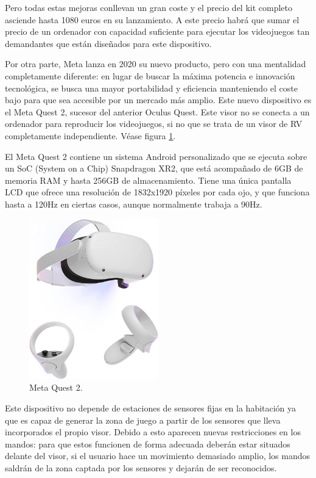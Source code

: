 Pero todas estas mejoras conllevan un gran coste y el precio del kit completo asciende hasta 1080 euros en su lanzamiento. A este precio habrá que sumar el precio de un ordenador con capacidad suficiente para ejecutar los videojuegos tan demandantes que están diseñados para este dispositivo.

Por otra parte, Meta lanza en 2020 su nuevo producto, pero con una mentalidad completamente diferente: en lugar de buscar la máxima potencia e innovación tecnológica, se busca una mayor portabilidad y eficiencia manteniendo el coste bajo para que sea accesible por un mercado más amplio. Este nuevo dispositivo es el Meta Quest 2, sucesor del anterior Oculus Quest. Este visor no se conecta a un ordenador para reproducir los videojuegos, si no que se trata de un visor de RV completamente independiente. Véase figura \ref{fig:EA_oculusQuest}.

El Meta Quest 2 contiene un sistema Android personalizado que se ejecuta sobre un SoC (System on a Chip) Snapdragon XR2, que está acompañado de 6GB de memoria RAM y hasta 256GB de almacenamiento. Tiene una única pantalla LCD que ofrece una resolución de 1832x1920 píxeles por cada ojo, y que funciona hasta a 120Hz en ciertas casos, aunque normalmente trabaja a 90Hz. \cite{EA_vr_quest2}


\begin{figure}
  \centering
\includegraphics[width=0.5\textwidth]{03.EstudioProblema/01.EstadoArte/00.Figuras/35.meta_quest_2.jpg}
    \caption{Meta Quest 2. \cite{EA_img_oculusQuest2}}
    \label{fig:EA_oculusQuest}
\end{figure}


Este dispositivo no depende de estaciones de sensores fijas en la habitación ya que es capaz de generar la zona de juego a partir de los sensores que lleva incorporados el propio visor. Debido a esto aparecen nuevas restricciones en los mandos: para que estos funcionen de forma adecuada deberán estar situados delante del visor, si el usuario hace un movimiento demasiado amplio, los mandos saldrán de la zona captada por los sensores y dejarán de ser reconocidos.

